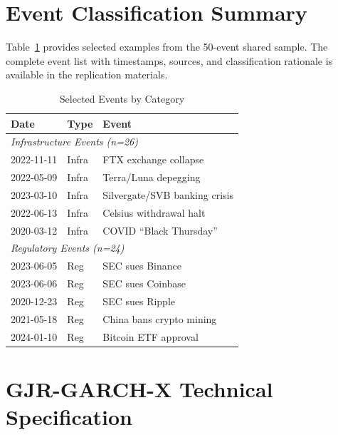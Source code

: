 \documentclass[pdflatex,sn-mathphys-num]{sn-jnl}
\theoremstyle{thmstyleone}
\theoremstyle{thmstyletwo}
\theoremstyle{thmstylethree}
\begin{document}

\begin{appendices}

\section{Event Classification Summary}\label{app:events}

Table~\ref{tab:events_summary} provides selected examples from the 50-event shared sample. The complete event list with timestamps, sources, and classification rationale is available in the replication materials.

\begin{table}[htbp]
\centering
\caption{Selected Events by Category}\label{tab:events_summary}
\small
\begin{tabular}{@{}llp{4.5cm}@{}}
\toprule
\textbf{Date} & \textbf{Type} & \textbf{Event} \\
\midrule
\multicolumn{3}{l}{\textit{Infrastructure Events (n=26)}} \\
2022-11-11 & Infra & FTX exchange collapse \\
2022-05-09 & Infra & Terra/Luna depegging \\
2023-03-10 & Infra & Silvergate/SVB banking crisis \\
2022-06-13 & Infra & Celsius withdrawal halt \\
2020-03-12 & Infra & COVID ``Black Thursday'' \\
\midrule
\multicolumn{3}{l}{\textit{Regulatory Events (n=24)}} \\
2023-06-05 & Reg & SEC sues Binance \\
2023-06-06 & Reg & SEC sues Coinbase \\
2020-12-23 & Reg & SEC sues Ripple \\
2021-05-18 & Reg & China bans crypto mining \\
2024-01-10 & Reg & Bitcoin ETF approval \\
\bottomrule
\end{tabular}
\end{table}

\section{GJR-GARCH-X Technical Specification}\label{app:tarchx}


\end{appendices}
\end{document}
